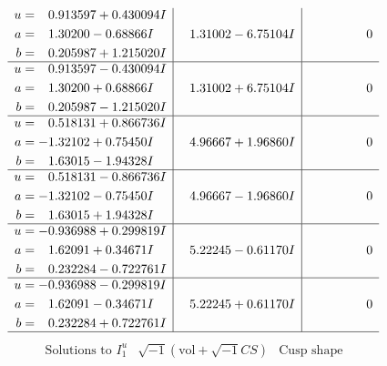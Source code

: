 \documentclass[1p]{elsarticle_modified}
\theoremstyle{definition}
\newcommand{\I}{\sqrt{-1}}
\begin{document}
$$\begin{array}{c|c|c}
\begin{aligned}
u &= \phantom{-}0.913597 + 0.430094 I \\
a &= \phantom{-}1.30200 - 0.68866 I \\
b &= \phantom{-}0.205987 + 1.215020 I\end{aligned}
 & \phantom{-}1.31002 - 6.75104 I & \phantom{-0.000000 } 0 \\ \hline\begin{aligned}
u &= \phantom{-}0.913597 - 0.430094 I \\
a &= \phantom{-}1.30200 + 0.68866 I \\
b &= \phantom{-}0.205987 - 1.215020 I\end{aligned}
 & \phantom{-}1.31002 + 6.75104 I & \phantom{-0.000000 } 0 \\ \hline\begin{aligned}
u &= \phantom{-}0.518131 + 0.866736 I \\
a &= -1.32102 + 0.75450 I \\
b &= \phantom{-}1.63015 - 1.94328 I\end{aligned}
 & \phantom{-}4.96667 + 1.96860 I & \phantom{-0.000000 } 0 \\ \hline\begin{aligned}
u &= \phantom{-}0.518131 - 0.866736 I \\
a &= -1.32102 - 0.75450 I \\
b &= \phantom{-}1.63015 + 1.94328 I\end{aligned}
 & \phantom{-}4.96667 - 1.96860 I & \phantom{-0.000000 } 0 \\ \hline\begin{aligned}
u &= -0.936988 + 0.299819 I \\
a &= \phantom{-}1.62091 + 0.34671 I \\
b &= \phantom{-}0.232284 - 0.722761 I\end{aligned}
 & \phantom{-}5.22245 - 0.61170 I & \phantom{-0.000000 } 0 \\ \hline\begin{aligned}
u &= -0.936988 - 0.299819 I \\
a &= \phantom{-}1.62091 - 0.34671 I \\
b &= \phantom{-}0.232284 + 0.722761 I\end{aligned}
 & \phantom{-}5.22245 + 0.61170 I & \phantom{-0.000000 } 0\\
 \hline 
 \end{array}$$\newpage$$\begin{array}{c|c|c}  
\text{Solutions to }I^u_{1}& \I (\text{vol} + \sqrt{-1}CS) & \text{Cusp shape}\\

\end{array}$$
\end{document}

